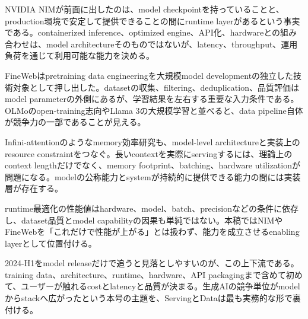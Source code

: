 
NVIDIA NIMが前面に出したのは、model checkpointを持っていることと、production環境で安定して提供できることの間にruntime layerがあるという事実である。containerized inference、optimized engine、API化、hardwareとの組み合わせは、model architectureそのものではないが、latency、throughput、運用負荷を通じて利用可能な能力を決める。\autocite{src-054d1f81750b}


FineWebはpretraining data engineeringを大規模model developmentの独立した技術対象として押し出した。datasetの収集、filtering、deduplication、品質評価はmodel parameterの外側にあるが、学習結果を左右する重要な入力条件である。OLMoのopen-training志向やLlama 3の大規模学習と並べると、data pipeline自体が競争力の一部であることが見える。\autocite{src-3d2fa83e273d,src-51631a225b70,src-f9616f30e8f5}


Infini-attentionのようなmemory効率研究も、model-level architectureと実装上のresource constraintをつなぐ。長いcontextを実際にservingするには、理論上のcontext lengthだけでなく、memory footprint、batching、hardware utilizationが問題になる。modelの公称能力とsystemが持続的に提供できる能力の間には実装層が存在する。\autocite{src-054d1f81750b,src-2eb2353f0533}


\begin{claimboundary}
runtime最適化の性能値はhardware、model、batch、precisionなどの条件に依存し、dataset品質とmodel capabilityの因果も単純ではない。本稿ではNIMやFineWebを「これだけで性能が上がる」とは扱わず、能力を成立させるenabling layerとして位置付ける。\autocite{src-054d1f81750b,src-51631a225b70}
\end{claimboundary}

2024-H1をmodel releaseだけで追うと見落としやすいのが、この上下流である。training data、architecture、runtime、hardware、API packagingまで含めて初めて、ユーザーが触れるcostとlatencyと品質が決まる。生成AIの競争単位がmodelからstackへ広がったという本号の主題を、ServingとDataは最も実務的な形で裏付ける。\autocite{src-054d1f81750b,src-2eb2353f0533,src-3d2fa83e273d,src-51631a225b70,src-f9616f30e8f5}

